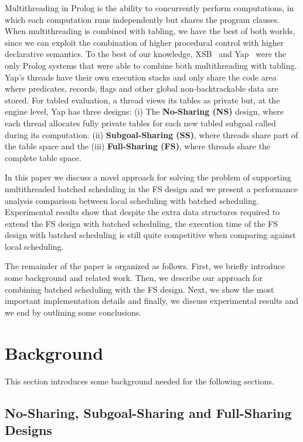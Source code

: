 \documentclass{llncs}
\begin{document}
Multithreading in Prolog is the ability to concurrently perform
computations, in which each computation runs independently but shares
the program clauses. When multithreading is combined with tabling, we
have the best of both worlds, since we can exploit the combination of
higher procedural control with higher declarative semantics. To the
best of our knowledge, XSB~\cite{Marques-08} and Yap~\cite{Areias-12a}
were the only Prolog systems that were able to combine both
multithreading with tabling. Yap's threads have their own execution
stacks and only share the code area where predicates, records, flags
and other global non-backtrackable data are stored. For tabled
evaluation, a thread views its tables as private but, at the engine
level, Yap has three designs: (i) The {\bf No-Sharing (NS)} design,
where each thread allocates fully private tables for each new tabled
subgoal called during its computation. (ii) {\bf Subgoal-Sharing
  (SS)}, where threads share part of the table space and the (iii)
{\bf Full-Sharing (FS)}, where threads share the complete table
space. 

In this paper we discuss a novel approach for solving the problem of
supporting multithreaded batched scheduling in the FS design and we
present a performance analysis comparison between local scheduling
with batched scheduling. Experimental results show that despite the
extra data structures required to extend the FS design with batched
scheduling, the execution time of the FS design with batched
scheduling is still quite competitive when comparing against local
scheduling.

The remainder of the paper is organized as follows. First, we briefly
introduce some background and related work. Then, we describe our
approach for combining batched scheduling with the FS design. Next, we
show the most important implementation details and finally, we discuss
experimental results and we end by outlining some conclusions.


\section{Background}

This section introduces some background needed for the following
sections. 

\subsection{No-Sharing, Subgoal-Sharing and Full-Sharing Designs}
\end{document}
